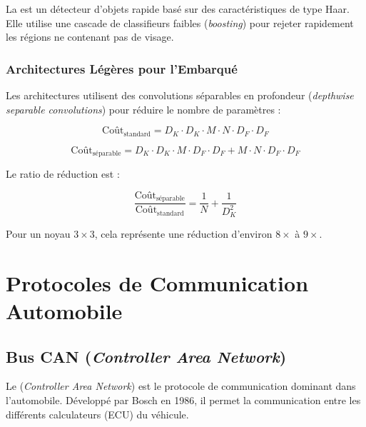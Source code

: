 La  \cite{viola2001} est un détecteur d'objets rapide basé sur des caractéristiques de type Haar. Elle utilise une cascade de classifieurs faibles (\textit{boosting}) pour rejeter rapidement les régions ne contenant pas de visage.

\subsubsection{Architectures Légères pour l'Embarqué}

Les architectures  \cite{howard2017, sandler2018} utilisent des convolutions séparables en profondeur (\textit{depthwise separable convolutions}) pour réduire le nombre de paramètres :

\begin{equation}
\text{Coût}_{\text{standard}} = D_K \cdot D_K \cdot M \cdot N \cdot D_F \cdot D_F
\label{eq:standard_conv_cost}
\end{equation}

\begin{equation}
\text{Coût}_{\text{séparable}} = D_K \cdot D_K \cdot M \cdot D_F \cdot D_F + M \cdot N \cdot D_F \cdot D_F
\label{eq:separable_conv_cost}
\end{equation}

Le ratio de réduction est :

\begin{equation}
\frac{\text{Coût}_{\text{séparable}}}{\text{Coût}_{\text{standard}}} = \frac{1}{N} + \frac{1}{D_K^2}
\label{eq:cost_ratio}
\end{equation}

Pour un noyau $3 \times 3$, cela représente une réduction d'environ $8 \times$ à $9 \times$.

\section{Protocoles de Communication Automobile}

\subsection{Bus CAN (\textit{Controller Area Network})}

Le  (\textit{Controller Area Network}) \cite{can2003} est le protocole de communication dominant dans l'automobile. Développé par Bosch en 1986, il permet la communication entre les différents calculateurs (ECU) du véhicule.


